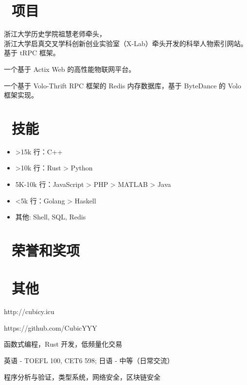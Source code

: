 \documentclass{resume}
\begin{document}
\section{\faFileCodeO\ 项目}
浙江大学历史学院祖慧老师牵头， \\ 
浙江大学启真交叉学科创新创业实验室（X-Lab）牵头开发的科举人物索引网站。\\
基于 tRPC 框架。

一个基于 Actix Web 的高性能物联网平台。

一个基于 Volo-Thrift RPC 框架的 Redis 内存数据库，基于 ByteDance 的 Volo 框架实现。

\section{\faCogs\ 技能}
\begin{itemize}[parsep=0.5ex]
  \item >15k 行：C++
  \item >10k 行：Rust > Python
  \item 5K-10k 行：JavaScript > PHP > MATLAB > Java
  \item <5k 行：Golang > Haskell
  \item 其他: Shell, SQL, Redis
\end{itemize}

\section{\faHeartO\ 荣誉和奖项}


\section{\faInfo\ 其他}
\begin{description}[parsep=0.5ex]
  \item[个人博客] http://cubicy.icu
  \item[GitHub] https://github.com/CubicYYY
  \item[技术兴趣] 函数式编程，Rust 开发，低频量化交易
  \item[语言能力] 英语 - TOEFL 100, CET6 598; 日语 - 中等（日常交流）
  \item[研究兴趣] 程序分析与验证，类型系统，网络安全，区块链安全
\end{description}

%
%
\end{document}

